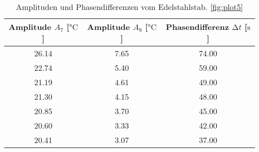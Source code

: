 \begin{table}
    \centering
    \caption{Amplituden und Phasendifferenzen vom Edelstahlstab. \ref{fig:plot5}}
    \label{tab:edelkappa}
    \begin{tabular}{c |c |c}
        \toprule
        Amplitude $A_{7}$ [$\si{\celsius}$]  & Amplitude $A_{8}$ [$\si{\celsius}$]& Phasendifferenz $\increment t$ [$\si{\second}$] \\
        \midrule
        26.14   &  7.65   & 74.00\\
        22.74   &  5.40   & 59.00\\
        21.19   &  4.61   & 49.00\\
        21.30   &  4.15   & 48.00 \\
        20.85   &  3.70    & 45.00 \\
        20.60   &  3.33   &  42.00 \\
        20.41   &  3.07   & 37.00  \\
        \bottomrule
    \end{tabular}
\end{table}
